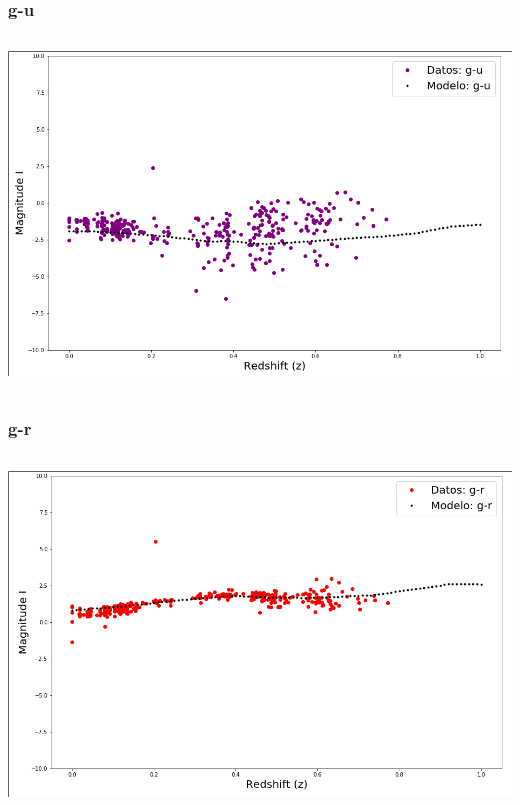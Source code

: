 \documentclass{beamer}
\begin{document}
\begin{frame}
\frametitle{g-u}
\begin{columns}
	\begin{column}{10cm}
		\includegraphics[width=\columnwidth]{gu.png} 
	\end{column}
\end{columns}
\end{frame}

\begin{frame}
\frametitle{g-r}
\begin{columns}
	\begin{column}{10cm}
		\includegraphics[width=\columnwidth]{gr} 
	\end{column}
\end{columns}
\end{frame}
\end{document}
